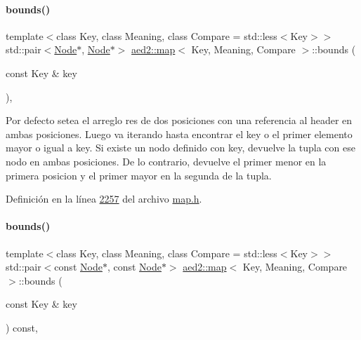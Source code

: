 \paragraph{\texorpdfstring{bounds()}{bounds()}\hspace{0.1cm}{\footnotesize\ttfamily [1/2]}}
{\footnotesize\ttfamily template$<$class Key, class Meaning, class Compare = std\+::less$<$\+Key$>$$>$ \\
std\+::pair$<$\hyperlink{structaed2_1_1map_1_1Node}{Node}$\ast$, \hyperlink{structaed2_1_1map_1_1Node}{Node}$\ast$$>$ \hyperlink{classaed2_1_1map}{aed2\+::map}$<$ Key, Meaning, Compare $>$\+::bounds (\begin{DoxyParamCaption}\item[{const Key \&}]{key }\end{DoxyParamCaption})\hspace{0.3cm}{\ttfamily [inline]}, {\ttfamily [private]}}

Por defecto setea el arreglo res de dos posiciones con una referencia al header en ambas posiciones. Luego va iterando hasta encontrar el key o el primer elemento mayor o igual a key. Si existe un nodo definido con key, devuelve la tupla con ese nodo en ambas posiciones. De lo contrario, devuelve el primer menor en la primera posicion y el primer mayor en la segunda de la tupla. 

Definición en la línea \hyperlink{map_8h_source_l02257}{2257} del archivo \hyperlink{map_8h_source}{map.\+h}.

\mbox{\label{classaed2_1_1map_a76b9671ef411cd38f918cbeadb998199_a76b9671ef411cd38f918cbeadb998199}} 
\paragraph{\texorpdfstring{bounds()}{bounds()}\hspace{0.1cm}{\footnotesize\ttfamily [2/2]}}
{\footnotesize\ttfamily template$<$class Key, class Meaning, class Compare = std\+::less$<$\+Key$>$$>$ \\
std\+::pair$<$const \hyperlink{structaed2_1_1map_1_1Node}{Node}$\ast$, const \hyperlink{structaed2_1_1map_1_1Node}{Node}$\ast$$>$ \hyperlink{classaed2_1_1map}{aed2\+::map}$<$ Key, Meaning, Compare $>$\+::bounds (\begin{DoxyParamCaption}\item[{const Key \&}]{key }\end{DoxyParamCaption}) const\hspace{0.3cm}{\ttfamily [inline]}, {\ttfamily [private]}}



